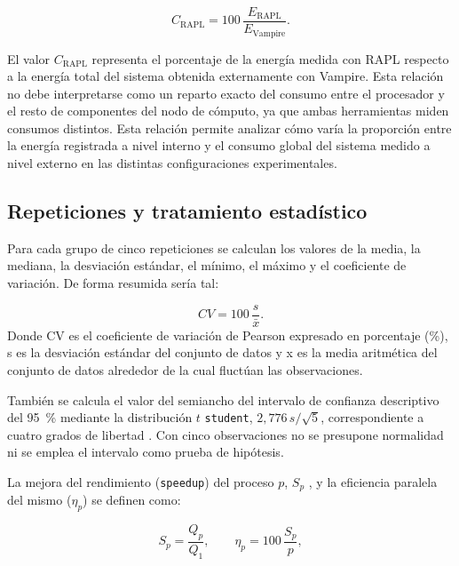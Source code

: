 \begin{equation}
    C_{\mathrm{RAPL}} =
    100\,
    \frac{E_{\mathrm{RAPL}}}
         {E_{\mathrm{Vampire}}}.
    \label{eq:cobertura-cap6}
\end{equation}

El valor \(C_{\mathrm{RAPL}}\) representa el porcentaje de la energía medida con RAPL respecto a la energía total del sistema obtenida externamente con Vampire. Esta relación no debe interpretarse como un reparto exacto del consumo entre el procesador y el resto de componentes del nodo de cómputo, ya que ambas herramientas miden consumos distintos. Esta relación permite analizar cómo varía la proporción entre la energía registrada a nivel interno y el consumo global del sistema medido a nivel externo en las distintas configuraciones experimentales.

\subsection{Repeticiones y tratamiento estadístico}
\label{subsec:repeticiones-cap6}

Para cada grupo de cinco repeticiones se calculan los valores de la media, la mediana, la desviación estándar, el mínimo, el máximo y el coeficiente de variación. De forma resumida sería tal:

\begin{equation}
    CV = 100\,\frac{s}{\bar{x}}.
    \label{eq:cv-cap6}
\end{equation}
Donde CV es el coeficiente de variación de Pearson expresado en porcentaje (\%), s es la desviación estándar del conjunto de datos y x es la media aritmética del conjunto de datos alrededor de la cual fluctúan las observaciones.

También se calcula el valor del semiancho del intervalo de confianza descriptivo del 95~\% mediante la distribución $t$ \texttt{student}, $2{,}776\,s/\sqrt{5}$, correspondiente a cuatro grados de libertad \parencite{nistConfidenceMean}. Con cinco observaciones no se presupone normalidad ni se emplea el intervalo como prueba de hipótesis.

La mejora del rendimiento (\texttt{speedup}) del proceso $p$, $S_p$ , y la eficiencia paralela del mismo ($\eta_p$) se definen como:

\begin{equation}
    S_p=\frac{Q_p}{Q_1},
    \qquad
    \eta_p=100\,\frac{S_p}{p},
    \label{eq:speedup-cap6}
\end{equation}

